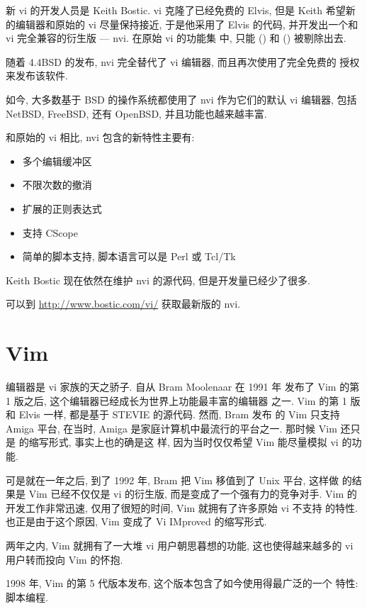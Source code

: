 新 vi 的开发人员是 Keith Bostic. vi 克隆了已经免费的 Elvis, 但是 
Keith 希望新的编辑器和原始的 vi 尽量保持接近, 于是他采用了 Elvis 的代码,
并开发出一个和 vi 完全兼容的衍生版 --- nvi. 在原始  vi 的功能集
中, 只能  () 和 
() 被剔除出去.

随着 4.4BSD 的发布, nvi 完全替代了 vi 编辑器, 而且再次使用了完全免费的
授权来发布该软件.

如今, 大多数基于 BSD 的操作系统都使用了 nvi 作为它们的默认 vi 编辑器,
包括 NetBSD, FreeBSD, 还有 OpenBSD, 并且功能也越来越丰富.

和原始的 vi 相比, nvi 包含的新特性主要有:
\begin{itemize}
    \item 多个编辑缓冲区
    \item 不限次数的撤消
    \item 扩展的正则表达式
    \item 支持 CScope
    \item 简单的脚本支持, 脚本语言可以是 Perl 或 Tcl/Tk
\end{itemize}

Keith Bostic 现在依然在维护 nvi 的源代码, 但是开发量已经少了很多.
\begin{warning}
    可以到 \url{http://www.bostic.com/vi/} 获取最新版的 nvi.
\end{warning}

\section{Vim}
\label{sec:vim}
 编辑器是 vi 家族的天之骄子. 自从 Bram Moolenaar 在 1991 年
发布了 Vim 的第 1 版之后, 这个编辑器已经成长为世界上功能最丰富的编辑器
之一.
Vim 的第 1 版和 Elvis 一样, 都是基于 STEVIE 的源代码. 然而, Bram 发布 
的 Vim 只支持 Amiga 平台, 在当时, Amiga 是家庭计算机中最流行的平台之一.
那时候 Vim 还只是  的缩写形式, 事实上也的确是这
样, 因为当时仅仅希望 Vim 能尽量模拟 vi 的功能.

可是就在一年之后, 到了 1992 年, Bram 把 Vim 移值到了 Unix 平台, 这样做
的结果是 Vim 已经不仅仅是 vi 的衍生版, 而是变成了一个强有力的竞争对手. Vim 
的开发工作非常迅速, 仅用了很短的时间, Vim 就拥有了许多原始 vi 不支持
的特性. 也正是由于这个原因, Vim 变成了 Vi IMproved 的缩写形式.

两年之内, Vim 就拥有了一大堆 vi 用户朝思暮想的功能, 这也使得越来越多的
vi 用户转而投向 Vim 的怀抱.

1998 年, Vim 的第 5 代版本发布, 这个版本包含了如今使用得最广泛的一个
特性: 脚本编程.

